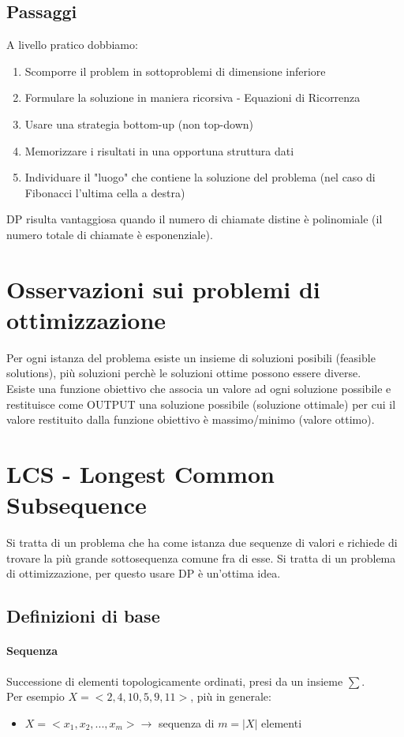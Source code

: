 \subsection{Passaggi}
A livello pratico dobbiamo:
\begin{enumerate}
    \item Scomporre il problem in sottoproblemi di dimensione inferiore
    \item Formulare la soluzione in maniera ricorsiva - Equazioni di Ricorrenza
    \item Usare una strategia bottom-up (non top-down)
    \item Memorizzare i risultati in una opportuna struttura dati
    \item Individuare il "luogo" che contiene la soluzione del problema (nel caso di Fibonacci l'ultima cella a destra)
\end{enumerate}
DP risulta vantaggiosa quando il numero di chiamate distine è polinomiale (il numero
totale di chiamate è esponenziale).
\section{Osservazioni sui problemi di ottimizzazione}
Per ogni istanza del problema esiste un insieme di soluzioni posibili (feasible solutions),
più soluzioni perchè le soluzioni ottime possono essere diverse.\\
Esiste una funzione obiettivo che associa un valore ad ogni soluzione possibile e
restituisce come OUTPUT una soluzione possibile (soluzione ottimale) per cui il valore restituito dalla funzione
obiettivo è massimo/minimo (valore ottimo).

\section{LCS - Longest Common Subsequence}
Si tratta di un problema che ha come istanza due sequenze di valori e richiede di trovare la 
più grande sottosequenza comune fra di esse. Si tratta di un problema di ottimizzazione, per questo
usare DP è un'ottima idea.
\subsection{Definizioni di base}
\paragraph*{Sequenza} Successione di elementi topologicamente ordinati, presi da un insieme
$\sum$.\\
Per esempio $X=<2,4,10,5,9,11>$, più in generale:
\begin{itemize}
    \item $X=<x_1, x_2, ..., x_m> \rightarrow$ sequenza di $m=|X|$ elementi
\end{itemize}
